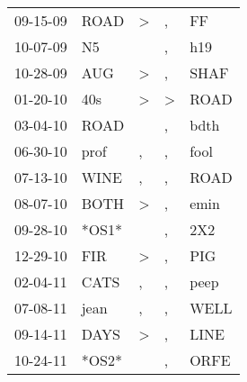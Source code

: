 \begin{supertabular}{p{0.07\textwidth}p{0.06\textwidth}p{0.02\textwidth}p{0.02\textwidth}p{0.06\textwidth}}
          09-15-09\textsuperscript{} &           ROAD\textsuperscript{} &     \textgreater &                , &             FF\textsuperscript{} \\
          10-07-09\textsuperscript{} &             N5\textsuperscript{} &                  &                , &            h19\textsuperscript{} \\
          10-28-09\textsuperscript{} &            AUG\textsuperscript{} &     \textgreater &                , &           SHAF\textsuperscript{} \\
          01-20-10\textsuperscript{} &            40s\textsuperscript{} &     \textgreater &     \textgreater &           ROAD\textsuperscript{} \\
          03-04-10\textsuperscript{} &           ROAD\textsuperscript{} &                  &                , &           bdth\textsuperscript{} \\
          06-30-10\textsuperscript{} &           prof\textsuperscript{} &                , &                , &           fool\textsuperscript{} \\
          07-13-10\textsuperscript{} &           WINE\textsuperscript{} &                , &                , &           ROAD\textsuperscript{} \\
          08-07-10\textsuperscript{} &           BOTH\textsuperscript{} &     \textgreater &                , &           emin\textsuperscript{} \\
          09-28-10\textsuperscript{} &                            *OS1* &                  &                , &            2X2\textsuperscript{} \\
          12-29-10\textsuperscript{} &            FIR\textsuperscript{} &     \textgreater &                , &            PIG\textsuperscript{} \\
          02-04-11\textsuperscript{} &           CATS\textsuperscript{} &                , &                , &           peep\textsuperscript{} \\
          07-08-11\textsuperscript{} &           jean\textsuperscript{} &                , &                , &           WELL\textsuperscript{} \\
          09-14-11\textsuperscript{} &           DAYS\textsuperscript{} &     \textgreater &                , &           LINE\textsuperscript{} \\
          10-24-11\textsuperscript{} &                            *OS2* &                  &                , &           ORFE\textsuperscript{} \\

\end{supertabular}
